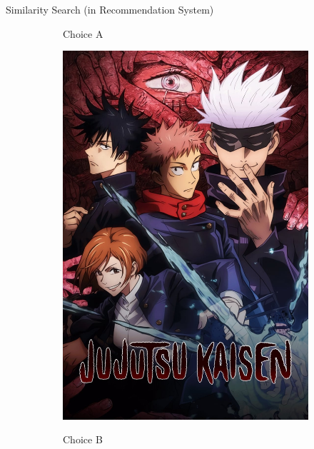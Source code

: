 \begin{frame}{Similarity Search (in Recommendation System)}
\begin{figure}[ht]
\begin{subfigure}{0.27\textwidth}
            {Choice A}
        \end{subfigure}
        \begin{subfigure}{0.27\textwidth}
            \centering
            \includegraphics[height=0.6\textheight]{images/jujutsu-kaisen.jpg}

            {Choice B}
        \end{subfigure}
        \hfill
    \end{figure}
\end{frame}

